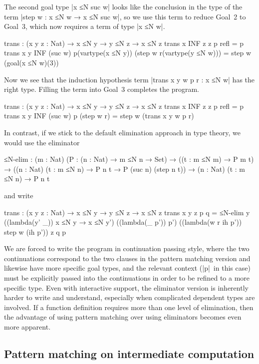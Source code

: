 The second goal type |x ≤N suc w| looks like the conclusion in the type of the term |step w : x ≤N w → x ≤N suc w|, so we use this term to reduce Goal~2 to Goal~3, which now requires a term of type |x ≤N w|.
\begin{code}
trans : (x y z : Nat) → x ≤N y → y ≤N z → x ≤N z
trans x  INF  z       z        p                   refl                         = p
trans x       y  INF  (suc w)  p(vartype(x ≤N y))  (step w r(vartype(y ≤N w)))  = step w (goal(x ≤N w)(3))
\end{code}
Now we see that the induction hypothesis term |trans x y w p r : x ≤N w| has the right type.
Filling the term into Goal~3 completes the program.
\begin{code}
trans : (x y z : Nat) → x ≤N y → y ≤N z → x ≤N z
trans x  INF  z       z        p refl        = p
trans x       y  INF  (suc w)  p (step w r)  = step w (trans x y w p r)
\end{code}
In contrast, if we stick to the default elimination approach in type theory, we would use the eliminator
\begin{code}
≤N-elim :  (m : Nat) (P : (n : Nat) → m ≤N n → Set) →
           ((t : m ≤N m) → P m t) →
           ((n : Nat) (t : m ≤N n) → P n t → P (suc n) (step n t)) →
           (n : Nat) (t : m ≤N n) → P n t
\end{code}
and write
\begin{code}
trans : (x y z : Nat) → x ≤N y → y ≤N z → x ≤N z
trans x y z p q = ≤N-elim y  ((lambda(y' _)) x ≤N y → x ≤N y')
                             ((lambda(_ p')) p') ((lambda(w r ih p')) step w (ih p')) z q p
\end{code}
We are forced to write the program in continuation passing style, where the two continuations correspond to the two clauses in the pattern matching version and likewise have more specific goal types, and the relevant context (|p|~in this case) must be explicitly passed into the continuations in order to be refined to a more specific type.
Even with interactive support, the eliminator version is inherently harder to write and understand, especially when complicated dependent types are involved.
If a function definition requires more than one level of elimination, then the advantage of using pattern matching over using eliminators becomes even more apparent.

\subsection{Pattern matching on intermediate computation}
\label{sec:with}

